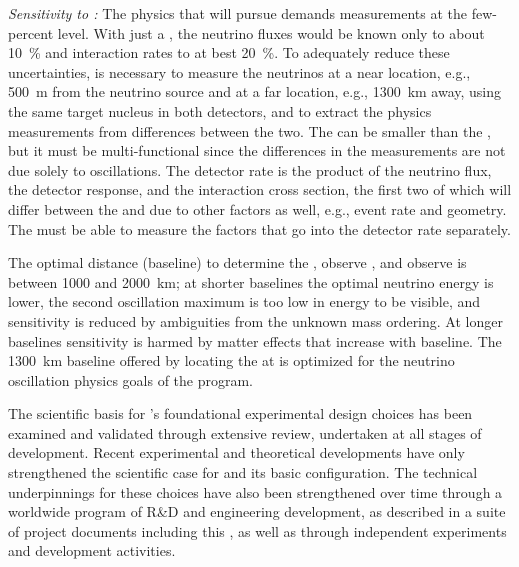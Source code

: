 \textit{Sensitivity to :}
The physics that  will pursue demands measurements at the few-percent level. With just a , the neutrino fluxes would be known only to about \SI{10}{\%} and interaction rates to at best \SI{20}{\%}.  To adequately reduce these uncertainties, is necessary to measure the neutrinos at a near location, e.g., \SI{500}{m} from the neutrino source and  at a far location, e.g., \SI{1300}{km} away, using the same target nucleus in both detectors, and to extract the physics measurements from differences between the two.  The  can be smaller than the , but it must be multi-functional since the differences in the measurements are not due solely to oscillations.  The detector rate is the product of the neutrino flux, the detector response, and the interaction cross section, the first two of which will differ between the  and  due to other factors as well, e.g.,  event rate and geometry. The  must be able to measure the factors that go into the detector rate separately.  

The optimal  distance (baseline) to determine the , observe , and observe \deltacp is between \num{1000} and \SI{2000}{km}; at shorter baselines the optimal neutrino energy is lower, the second oscillation maximum is too low in energy to be visible, and  sensitivity is reduced by ambiguities from the unknown mass ordering. At longer baselines  sensitivity is harmed by matter effects that increase with baseline. The \SI{1300}{km} baseline offered by locating the  at  is optimized for the neutrino oscillation physics goals of the  program.

 The scientific basis for 's foundational experimental
design choices has been examined and validated through extensive
review, undertaken at all stages of  development.
Recent experimental and theoretical developments have only
strengthened the scientific case for  and its
basic configuration.  The technical underpinnings for
these choices have also been strengthened over time through a worldwide
program of R\&D and engineering development, as described in a suite
of  project documents including this , as
well as %
through independent experiments and development
activities.

